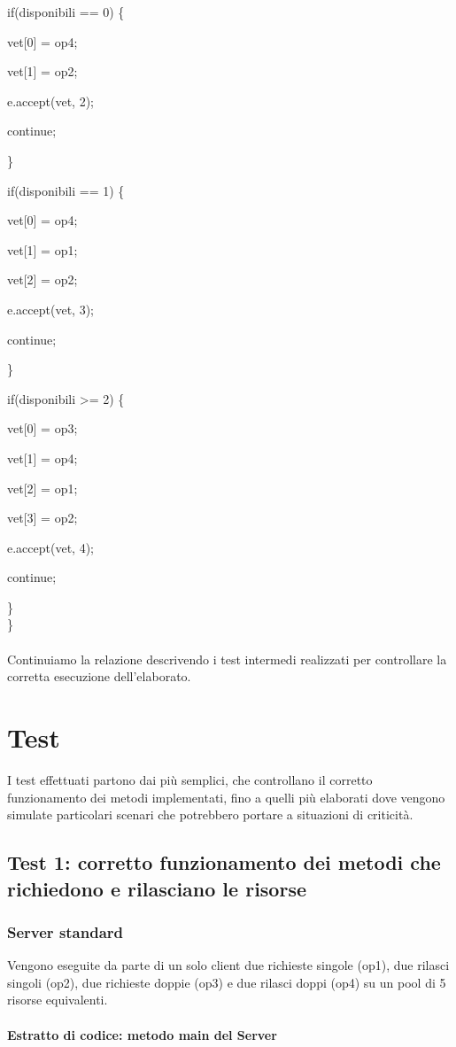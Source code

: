 \documentclass[10pt, a4paper]{article}
\begin{document}
	if(disponibili == 0) \{

                vet[0] = op4;

                vet[1] = op2;

                e.accept(vet, 2);

                continue;

	\}

        if(disponibili == 1) \{

                vet[0] = op4;

                vet[1] = op1;

                vet[2] = op2;

                e.accept(vet, 3);

                continue;

        \}

        if(disponibili \textgreater= 2) \{

                vet[0] = op3;

                vet[1] = op4;

                vet[2] = op1;

                vet[3] = op2;

                e.accept(vet, 4);

                continue;

        \}\\
\}
\\\\
Continuiamo la relazione descrivendo i test intermedi realizzati per controllare la corretta esecuzione dell'elaborato.
\section{Test}
I test effettuati partono dai più semplici, che controllano il corretto funzionamento dei metodi implementati, fino a quelli più elaborati dove vengono simulate particolari scenari che potrebbero portare a situazioni di criticità.
\subsection{Test 1: corretto funzionamento dei metodi che richiedono e rilasciano le risorse}
\subsubsection{Server standard}
Vengono eseguite da parte di un solo client due richieste singole (op1), due rilasci singoli (op2), due richieste doppie (op3) e due rilasci doppi (op4) su un pool di 5 risorse equivalenti.
\\\\
\textbf{Estratto di codice: metodo main del Server}
\\
\end{document}
